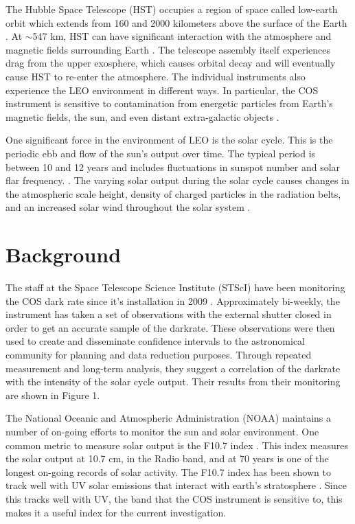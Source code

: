 \documentclass[a4paper,11pt]{article}
\begin{document}
The Hubble Space Telescope (HST) occupies a region of space called low-earth orbit
which extends from 160 and 2000 kilometers above the surface of the Earth \cite{leo}.   At $\sim$547 km,  HST 
can have significant interaction with the atmosphere and magnetic fields surrounding Earth \cite{hst}.  The telescope assembly
 itself experiences drag from the upper exosphere, which causes orbital decay and will eventually cause HST to 
 re-enter the atmosphere.  The individual instruments also experience the LEO environment in different ways.  
 In particular, the COS instrument is sensitive to contamination from energetic particles from Earth's magnetic fields,
 the sun, and even distant extra-galactic objects \cite{fox} \cite{norton}.

One significant force in the environment of LEO is the solar cycle.  This is the periodic ebb and flow of the sun's 
output over time.  The typical period is between 10 and 12 years and includes fluctuations in sunspot
 number and solar flar frequency. \cite{mercedes}.  The varying solar output during the solar cycle causes changes
 in the atmospheric scale height, density of charged particles in the radiation belts, and an increased solar wind
 throughout the solar system \cite{mercedes}.

\section{Background}
The staff at the Space Telescope Science Institute (STScI) have been monitoring the COS 
dark rate since it's installation in 2009 \cite{fox}.  Approximately bi-weekly, the instrument has taken a set of 
observations with the external shutter closed in order to get an accurate sample of the darkrate.  These 
observations were then used to create and disseminate confidence intervals to the astronomical community 
for planning and data reduction purposes.  Through repeated measurement and long-term analysis, they suggest a correlation of
the darkrate with the intensity of the solar cycle output.  Their results from their monitoring are shown in Figure 1.    

The National Oceanic and Atmospheric Administration (NOAA) maintains a number of on-going 
efforts to monitor the sun and solar environment.  One common metric to measure solar output is the F10.7 index \cite{norton}.  This index measures the solar output at 10.7 cm, in the Radio band,
and at 70 years is one of the longest on-going records of solar activity.  The F10.7 index has been shown to track well with UV solar emissions that interact with earth's stratosphere \cite{norton}.  Since this tracks well with UV, the band that the COS instrument is sensitive to, this makes it a useful index for the current investigation.
\end{document}
